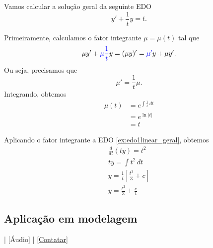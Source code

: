\begin{ex}
  Vamos calcular a solução geral da seguinte EDO
  \begin{equation}\label{ex:edo1linear_geral}
    y' + \frac{1}{t}y = t.
  \end{equation}

  Primeiramente, calculamos o fator integrante $\mu = \mu(t)$ tal que
  \begin{equation}
    \mu y' + {\color{blue}\mu \frac{1}{t}} y = (\mu y)' = {\color{blue}\mu'}y + \mu y'.
  \end{equation}
  Ou seja, precisamos que
  \begin{equation}
    \mu' = \frac{1}{t}\mu.
  \end{equation}
  Integrando, obtemos
  \begin{align}
    \mu(t) &= e^{\int \frac{1}{t}\,dt} \\
    &= e^{\ln|t|} \\
    &= t
  \end{align}

  Aplicando o fator integrante a EDO \eqref{ex:edo1linear_geral}, obtemos
  \begin{gather}
    \frac{d}{dt}\left(t y\right) = t^2 \\
    ty = \int t^2\,dt \\
    y = \frac{1}{t}\left[\frac{t^3}{3} + c\right] \\
    y = \frac{t^2}{3} + \frac{c}{t}
  \end{gather}
\end{ex}

\subsection{Aplicação em modelagem}

\begin{flushright}
  [Vídeo] | [Áudio] | \href{https://phkonzen.github.io/notas/contato.html}{[Contatar]}
\end{flushright}

